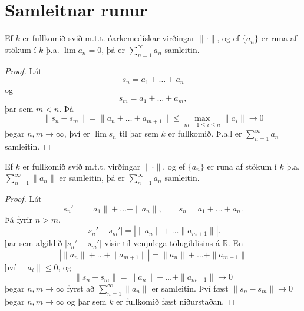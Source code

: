 \section*{Samleitnar runur}
\begin{setn}
Ef $k$ er fullkomið svið m.t.t. óarkemedískar virðingar $\| \cdot  \|$, og ef $\{ a_n \} $ er 
runa af stökum í $k$ þ.a. $\lim a_n = 0$, þá er $\sum_{n=1}^\infty a_n$ samleitin.
\end{setn}
\begin{proof}
Lát 
\begin{equation*}
s_n = a_1+ \ldots + a_n
\end{equation*}
og
\begin{equation*}
s_m = a_1 + \ldots + a_m,
\end{equation*}
þar sem $m < n$. Þá
\begin{equation*}
\|s_n - s_m \| = \| a_n + \ldots + a_{m+1} \| \leq \max_{m+1 \leq i \leq n} \|a_i\| \rightarrow 0
\end{equation*}
þegar $n,m \rightarrow \infty$, því er $\lim s_n$ til þar sem $k$ er fullkomið. Þ.a.l er $\sum_{n=1}^\infty a_n$ samleitin.
\end{proof}

\begin{setn}
Ef $k$ er fullkomið svið m.t.t. virðingar $\| \cdot \|$, og ef $\{ a_n \}$ er runa af stökum í $k$ 
þ.a. $\sum_{n=1}^{\infty} \| a_n \| $ er samleitin, þá er $\sum_{n=1}^\infty a_n $ samleitin. 
\end{setn}
\begin{proof}
Lát 
\begin{equation*}
 s_n' = \| a_1 \| + \ldots + \|a_n\|, \qquad s_n = a_1 + \ldots + a_n.
\end{equation*}
Þá fyrir $n>m$, 
\begin{equation*}
|s_n'- s_m' | = | \| a_n \| + \ldots \|a_{m+1}\| |.
\end{equation*}
þar sem algildið $| s_n' - s_m' | $ vísir til venjulega  tölugildisins á $\mathbb{R}$. En 
\begin{equation*}
| \| a_n \| + \ldots + \| a_{m+1} \| | = \| a_n \| + \ldots + \| a_{m+1} \|
\end{equation*}
því $\| a_i \| \leq 0$, og 
\begin{equation}
\| s_n - s_m \| = \|a_n\| + \ldots + \|a_{m+1}\| \rightarrow 0
\end{equation}
þegar $n,m \rightarrow \infty$ fyrst að $\sum_{n=1}^\infty \|a_n\|$ er samleitin. 
Því fæst $\|s_n - s_m \| \rightarrow 0$ þegar $n,m \rightarrow \infty $ og þar sem $k$ er fullkomið fæst niðurstaðan.  
\end{proof}

